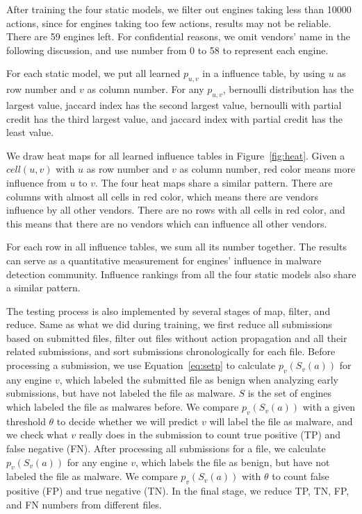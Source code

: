 After training the four static models, 
we filter out engines taking less than 10000 actions,
since for engines taking too few actions, results may not be reliable. 
There are 59 engines left.
For confidential reasons, we omit vendors’ name in the following discussion, 
and use number from 0 to 58 to represent each engine. 

For each static model, 
we put all learned $p_{u,v}$ in a influence table, 
by using $u$ as row number and $v$ as column number.
For any $p_{u,v}$, bernoulli distribution has the largest value, 
jaccard index has the second largest value, 
bernoulli with partial credit has the third largest value,
and jaccard index with partial credit has the least value. 



We draw heat maps for all learned influence tables in Figure~\ref{fig:heat}. 
Given a $cell(u, v)$ with $u$ as row number and $v$ as column number, 
red color means more influence from $u$ to $v$. 
The four heat maps share a similar pattern.
There are columns with almost all cells in red color, 
which means there are vendors influence by all other vendors. 
There are no rows with all cells in red color, 
and this means that there are no vendors which can influence all other vendors. 

For each row in all influence tables, we sum all its number together. 
The results can serve as a quantitative measurement for engines' influence in malware detection community. 
Influence rankings from all the four static models also share a similar pattern. 

The testing process is also implemented by several stages of map, filter, and reduce.
Same as what we did during training, 
we first reduce all submissions based on submitted files, 
filter out files without action propagation and all their related submissions, 
and sort submissions chronologically for each file. 
Before processing a submission, we use Equation~\ref{eq:setp} to
calculate $p_v(S_v(a))$ for any engine $v$, 
which labeled the submitted file as benign when analyzing early submissions, 
but have not labeled the file as malware. 
$S$ is the set of engines which labeled the file as malwares before.
We compare $p_v(S_v(a))$ with a given threshold $\theta$ to decide whether we will predict 
$v$ will label the file as malware, and we check what $v$ 
really does in the submission to count true positive (TP) and false negative (FN). 
After processing all submissions for a file, 
we calculate $p_v(S_v(a))$ for any engine $v$, 
which labels the file as benign, but have not labeled the file as malware.
We compare $p_v(S_v(a))$ with $\theta$ to count false positive (FP) and true negative (TN).
In the final stage, we reduce TP, TN, FP, and FN numbers from different files.


